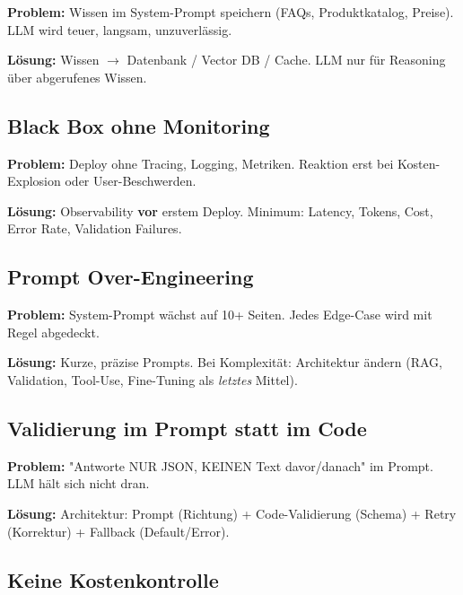 \textbf{Problem:} Wissen im System-Prompt speichern (FAQs, Produktkatalog, Preise). LLM wird teuer, langsam, unzuverlässig.

\textbf{Lösung:} Wissen $\to$ Datenbank / Vector DB / Cache. LLM nur für Reasoning über abgerufenes Wissen.


\subsection{Black Box ohne Monitoring}

\textbf{Problem:} Deploy ohne Tracing, Logging, Metriken. Reaktion erst bei Kosten-Explosion oder User-Beschwerden.

\textbf{Lösung:} Observability \textbf{vor} erstem Deploy. Minimum: Latency, Tokens, Cost, Error Rate, Validation Failures.

\subsection{Prompt Over-Engineering}

\textbf{Problem:} System-Prompt wächst auf 10+ Seiten. Jedes Edge-Case wird mit Regel abgedeckt.

\textbf{Lösung:} Kurze, präzise Prompts. Bei Komplexität: Architektur ändern (RAG, Validation, Tool-Use, Fine-Tuning als \textit{letztes} Mittel).


\subsection{Validierung im Prompt statt im Code}

\textbf{Problem:} "Antworte NUR JSON, KEINEN Text davor/danach" im Prompt. LLM hält sich nicht dran.

\textbf{Lösung:} Architektur: Prompt (Richtung) + Code-Validierung (Schema) + Retry (Korrektur) + Fallback (Default/Error).

\subsection{Keine Kostenkontrolle}

